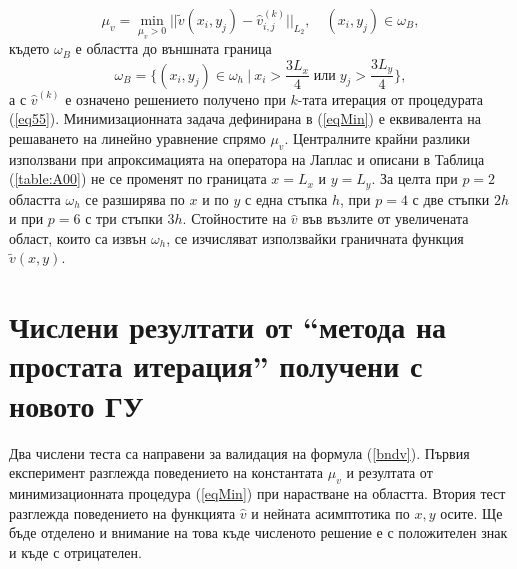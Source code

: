 \documentclass{article}
\newcommand{\be}{\begin{equation}}
\newcommand{\ee}{\end{equation}}
\newcommand{\rf}[1]{(\ref{#1})}
\begin{document}
\begin{equation}\label{eqMin}
\mu_v = \min_{ \mu_v > 0 } || \tilde v( x_i, y_j) - \widehat v^{(k)}_{i,j} ||_{L_2}, \quad (x_i, y_j) \in \omega_B ,
\end{equation}
където $\omega_B$ е областта до външната граница
\be\label{omegaB}
\omega_B = \{ (x_i, y_j) \in \omega_h \: | \: x_i > \frac{3L_x}{4} \; \textbf{или} \; y_j > \frac{3L_y}{4} \},
\ee
а с $\widehat v^{(k)}$ е означено решението получено при $k$-тата итерация от процедурата \rf{eq55}. Минимизационната задача дефинирана в \rf{eqMin} е еквивалента на решаването на линейно уравнение спрямо $\mu_v$. Централните крайни разлики използвани при апроксимацията на оператора на Лаплас и описани в Таблица \rf{table:A00} не се променят по границата $x=L_x$ и $y=L_y$. За целта при $p=2$ областта $\omega_h$ се разширява по $x$ и по $y$ с една стъпка $h$, при $p=4$ с две стъпки $2h$ и при $p=6$ с три стъпки $3h$.
Стойностите на $\widehat v$ във възлите от увеличената област, които са извън $\omega_h$, се изчисляват използвайки граничната функция $\tilde v(x, y)$.

\section{Числени резултати от ``метода на простата итерация'' получени с новото ГУ}
Два числени теста са направени за валидация на формула \rf{bndv}. Първия експеримент разглежда поведението на константата $\mu_v$ и резултата от минимизационната процедура \rf{eqMin} при нарастване на областта. Втория тест разглежда поведението на функцията $\widehat v$ и нейната асимптотика по $x,y$ осите. Ще бъде отделено и внимание на това къде численото решение е с положителен знак и къде с отрицателен.
\end{document}
